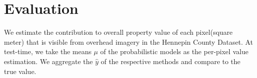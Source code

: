 \documentclass[10pt,twocolumn,a4paper]{article}
\newcommand{\cash}[1]{\SI{#1}[\$]{}}
\begin{document}


\section{Evaluation}
\label{sec:evaluation}
 We estimate the contribution to overall property value of each pixel(square meter) that is visible from overhead imagery in the Hennepin County Dataset. At test-time, we take the means $\mu$ of the probabilistic models as the per-pixel value estimation. We aggregate the $\hat{y}$ of the respective methods and compare to the true value.
\end{document}
